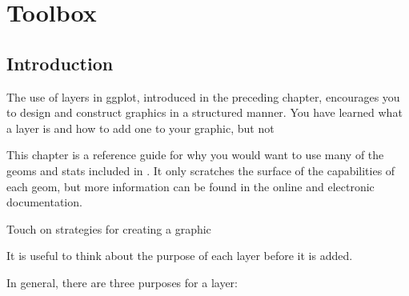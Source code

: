 

% 


\chapter{Toolbox}
\label{cha:toolbox}

\section{Introduction}

The use of layers in ggplot, introduced in the preceding chapter, encourages you to design and construct graphics in a structured manner.  You have learned what a layer is and how to add one to your graphic, but not 

This chapter is a reference guide for why you would want to use many of the geoms and stats included in \ggplot.  It only scratches the surface of the capabilities of each geom, but more information can be found in the online and electronic documentation.

Touch on strategies for creating a graphic

It is useful to think about the purpose of each layer before it is added.  

In general, there are three purposes for a layer:

